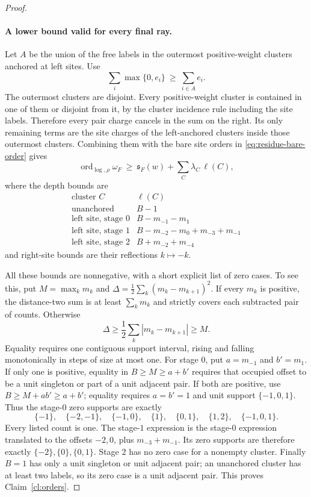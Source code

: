 \begin{proof}
\paragraph{A lower bound valid for every final ray.}
Let $A$ be the union of the free labels in the outermost positive-weight
clusters anchored at left sites. Use
\[
 \sum_i\max\{0,e_i\}\ \ge\ \sum_{i\in A}e_i.
\]
The outermost clusters are disjoint. Every positive-weight cluster is
contained in one of them or disjoint from it, by the cluster incidence
rule including the site labels. Therefore every pair charge cancels in
the sum on the right. Its only remaining terms are the site charges of
the left-anchored clusters inside those outermost clusters. Combining
them with the bare site orders in
\eqref{eq:residue-bare-order} gives
\begin{equation}\label{eq:residue-depth-bound}
 \operatorname{ord}_{\log,\rho}\omega_F
 \ \ge\ \mathfrak s_F(w)+\sum_C\lambda_C\,\ell(C),
\end{equation}
where the depth bounds are
\[
\begin{array}{c|l}
\text{cluster }C&\ell(C)\\\hline
\text{unanchored}&B-1\\
\text{left site, stage }0&B-m_{-1}-m_1\\
\text{left site, stage }1&B-m_{-2}-m_0+m_{-3}+m_{-1}\\
\text{left site, stage }2&B+m_{-2}+m_{-4}
\end{array}
\]
and right-site bounds are their reflections $k\mapsto-k$.

All these bounds are nonnegative, with a short explicit list of zero
cases. To see this, put $M=\max_km_k$ and
$\Delta=\frac12\sum_k(m_k-m_{k+1})^2$. If every $m_k$ is positive, the
distance-two sum is at least $\sum_km_k$ and strictly covers each
subtracted pair of counts. Otherwise
\[
 \Delta\ge\frac12\sum_k|m_k-m_{k+1}|\ge M.
\]
Equality requires one contiguous support interval, rising and falling
monotonically in steps of size at most one. For stage $0$, put
$a=m_{-1}$ and $b'=m_1$. If only one is positive, equality in
$B\ge M\ge a+b'$ requires that occupied offset to be a unit singleton
or part of a unit adjacent pair. If both are positive, use
$B\ge M+ab'\ge a+b'$; equality requires $a=b'=1$ and unit support
$\{-1,0,1\}$. Thus the stage-$0$ zero supports are exactly
\[
 \{-1\},\quad\{-2,-1\},\quad\{-1,0\},\quad
 \{1\},\quad\{0,1\},\quad\{1,2\},\quad\{-1,0,1\}.
\]
Every listed count is one. The stage-$1$ expression is the stage-$0$
expression translated to the offsets $-2,0$, plus
$m_{-3}+m_{-1}$. Its zero supports are therefore exactly
$\{-2\},\{0\},\{0,1\}$. Stage $2$ has no zero case for a nonempty
cluster. Finally $B=1$ has only a unit singleton or unit adjacent pair;
an unanchored cluster has at least two labels, so its zero case is a
unit adjacent pair. This proves Claim~\ref{cl:orders}.


\end{proof}
